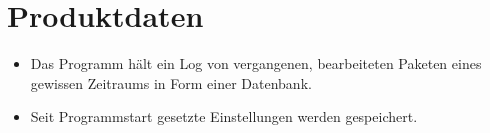 \chapter{Produktdaten}


\begin{itemize}
  \item Das Programm hält ein Log von vergangenen, bearbeiteten Paketen eines gewissen Zeitraums in Form einer Datenbank.
  \item Seit Programmstart gesetzte Einstellungen werden gespeichert.
\end{itemize}